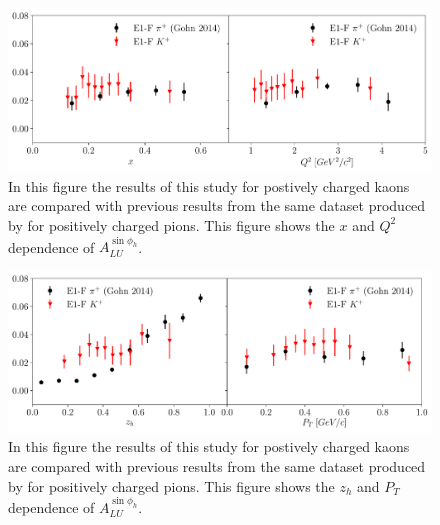 
\begin{figure}
	\centering
	\includegraphics[width=16cm]{image/plots/kaon-bsa/compare-pion-xq2.pdf}
	\caption{In this figure the results of this study for postively charged kaons are compared with previous results from the same dataset produced by \cite{tmds-gohn:2014} for positively charged pions.  This figure shows the $x$ and $Q^2$ dependence of $A_{LU}^{\sin\phi_h}$.}
\end{figure}

\begin{figure}
	\centering
	\includegraphics[width=16cm]{image/plots/kaon-bsa/compare-pion-zpt.pdf}
	\caption{In this figure the results of this study for postively charged kaons are compared with previous results from the same dataset produced by \cite{tmds-gohn:2014} for positively charged pions.  This figure shows the $z_h$ and $P_T$ dependence of $A_{LU}^{\sin\phi_h}$.}
\end{figure}

